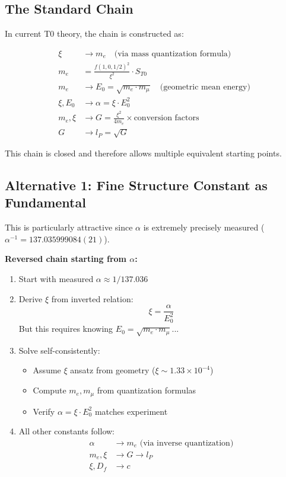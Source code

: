 	\subsection{The Standard Chain}
	
	In current T0 theory, the chain is constructed as:
	
	\begin{align}
		\xi &\to m_e \quad \text{(via mass quantization formula)} \nonumber\\
		m_e &= \frac{f(1,0,1/2)^2}{\xi^2} \cdot S_{T0} \\
		m_e &\to E_0 = \sqrt{m_e \cdot m_\mu} \quad \text{(geometric mean energy)} \\
		\xi, E_0 &\to \alpha = \xi \cdot E_0^2 \\
		m_e, \xi &\to G = \frac{\xi^2}{4 m_e} \times \text{conversion factors} \\
		G &\to l_P = \sqrt{G}
	\end{align}
	
	This chain is closed and therefore allows multiple equivalent starting points.
	
	\subsection{Alternative 1: Fine Structure Constant as Fundamental}
	
	This is particularly attractive since $\alpha$ is extremely precisely measured ($\alpha^{-1} = 137.035999084(21)$).
	
	\textbf{Reversed chain starting from $\alpha$:}
	
	\begin{enumerate}
		\item Start with measured $\alpha \approx 1/137.036$
		
		\item Derive $\xi$ from inverted relation:
		\[
		\xi = \frac{\alpha}{E_0^2}
		\]
		But this requires knowing $E_0 = \sqrt{m_e \cdot m_\mu}$...
		
		\item Solve self-consistently:
		\begin{itemize}
			\item Assume $\xi$ ansatz from geometry ($\xi \sim 1.33 \times 10^{-4}$)
			\item Compute $m_e, m_\mu$ from quantization formulas
			\item Verify $\alpha = \xi \cdot E_0^2$ matches experiment
		\end{itemize}
		
		\item All other constants follow:
		\begin{align}
			\alpha &\to m_e \text{ (via inverse quantization)} \\
			m_e, \xi &\to G \to l_P \\
			\xi, D_f &\to c
		\end{align}
	\end{enumerate}
	
